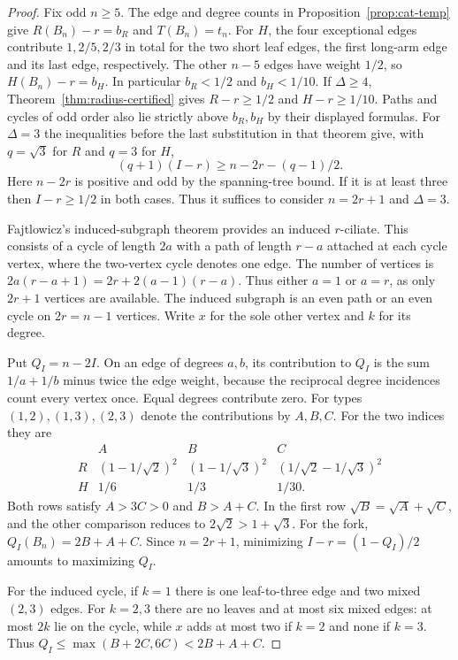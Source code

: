 \documentclass[11pt,a4paper]{article}
\begin{document}
\begin{proof}
Fix odd $n\ge5$. The edge and degree counts in
Proposition~\ref{prop:cat-temp} give $R(B_n)-r=b_R$ and $T(B_n)=t_n$.
For $H$, the four exceptional edges contribute $1,2/5,2/3$ in total
for the two short leaf edges, the first long-arm edge and its last edge,
respectively. The other $n-5$ edges have weight $1/2$, so $H(B_n)-r=b_H$.
In particular $b_R<1/2$ and $b_H<1/10$.
If $\Delta\ge4$, Theorem~\ref{thm:radius-certified} gives $R-r\ge1/2$
and $H-r\ge1/10$. Paths and cycles of odd order also lie strictly
above $b_R,b_H$ by their displayed formulas. For $\Delta=3$ the
inequalities before the last substitution in that theorem give, with
$q=\sqrt3$ for $R$ and $q=3$ for $H$,
\[
 (q+1)(I-r)\ge n-2r-(q-1)/2.
\]
Here $n-2r$ is positive and odd by the spanning-tree bound. If it is
at least three then $I-r\ge1/2$ in both cases.
Thus it suffices to consider $n=2r+1$ and $\Delta=3$.

Fajtlowicz's induced-subgraph theorem \cite[Theorem~2]{fork-ciliate}
provides an induced $r$-ciliate. This consists of a cycle of length
$2a$ with a path of length $r-a$ attached at each cycle vertex,
where the two-vertex cycle denotes one edge. The number of vertices is
$2a(r-a+1)=2r+2(a-1)(r-a)$. Thus either $a=1$ or $a=r$,
as only $2r+1$ vertices are available. The induced subgraph is an
even path or an even cycle on $2r=n-1$ vertices. Write $x$ for the
sole other vertex and $k$ for its degree.

Put $Q_I=n-2I$. On an edge of degrees $a,b$, its contribution to $Q_I$
is the sum $1/a+1/b$ minus twice the edge weight, because the reciprocal
degree incidences count every vertex once. Equal degrees contribute zero.
For types $(1,2),(1,3),(2,3)$ denote the contributions by $A,B,C$.
For the two indices they are
\[
\begin{array}{c|ccc}
 &A&B&C\\\hline
 R&(1-1/\sqrt2)^2&(1-1/\sqrt3)^2&(1/\sqrt2-1/\sqrt3)^2\\
 H&1/6&1/3&1/30 .
\end{array}
\]
Both rows satisfy $A>3C>0$ and $B>A+C$.
In the first row $\sqrt B=\sqrt A+\sqrt C$, and the other comparison
reduces to $2\sqrt2>1+\sqrt3$.
For the fork, $Q_I(B_n)=2B+A+C$.
Since $n=2r+1$, minimizing $I-r=(1-Q_I)/2$ amounts to maximizing $Q_I$.

For the induced cycle, if $k=1$ there is one leaf-to-three edge
and two mixed $(2,3)$ edges. For $k=2,3$ there are no leaves and
at most six mixed edges: at most $2k$ lie on the cycle, while $x$
adds at most two if $k=2$ and none if $k=3$. Thus
$Q_I\le\max(B+2C,6C)<2B+A+C$.


\end{proof}
\end{document}
